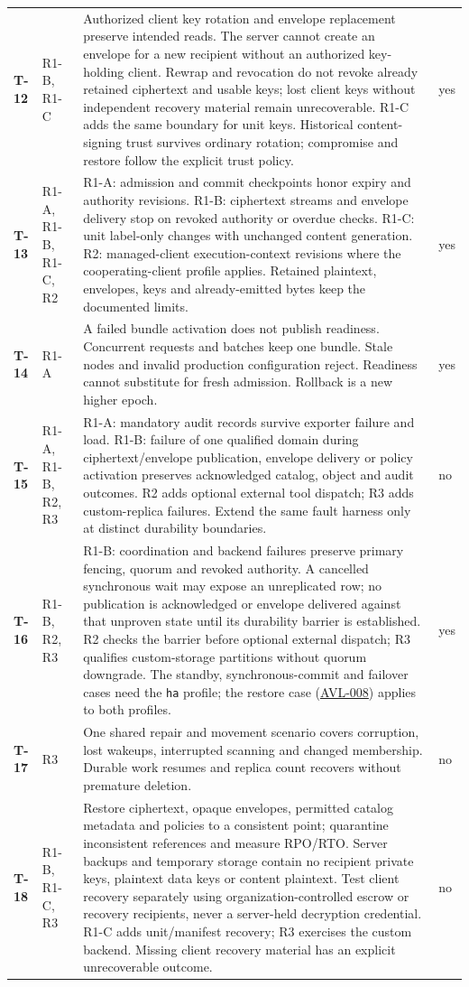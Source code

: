 \documentclass[11pt,a4paper]{article}
\newcommand{\code}[1]{{\small\nolinkurl{#1}}}
\newcommand{\rr}[1]{\hyperlink{req:#1}{#1}}
\newcommand{\testrow}[4]{\hypertarget{test:#1}{\textbf{#1}} & #2 & #3 & #4\\}
\begin{document}
\begin{longtable}{@{}P{0.06\textwidth}P{0.09\textwidth}P{0.68\textwidth}P{0.09\textwidth}@{}}
\testrow{T-12}{R1-B, R1-C}{Authorized client key rotation and envelope replacement preserve intended reads. The server cannot create an envelope for a new recipient without an authorized key-holding client. Rewrap and revocation do not revoke already retained ciphertext and usable keys; lost client keys without independent recovery material remain unrecoverable. R1-C adds the same boundary for unit keys. Historical content-signing trust survives ordinary rotation; compromise and restore follow the explicit trust policy.}{yes}
\testrow{T-13}{R1-A, R1-B, R1-C, R2}{R1-A: admission and commit checkpoints honor expiry and authority revisions. R1-B: ciphertext streams and envelope delivery stop on revoked authority or overdue checks. R1-C: unit label-only changes with unchanged content generation. R2: managed-client execution-context revisions where the cooperating-client profile applies. Retained plaintext, envelopes, keys and already-emitted bytes keep the documented limits.}{yes}
\testrow{T-14}{R1-A}{A failed bundle activation does not publish readiness. Concurrent requests and batches keep one bundle. Stale nodes and invalid production configuration reject. Readiness cannot substitute for fresh admission. Rollback is a new higher epoch.}{yes}
\testrow{T-15}{R1-A, R1-B, R2, R3}{R1-A: mandatory audit records survive exporter failure and load. R1-B: failure of one qualified domain during ciphertext/envelope publication, envelope delivery or policy activation preserves acknowledged catalog, object and audit outcomes. R2 adds optional external tool dispatch; R3 adds custom-replica failures. Extend the same fault harness only at distinct durability boundaries.}{no}
\testrow{T-16}{R1-B, R2, R3}{R1-B: coordination and backend failures preserve primary fencing, quorum and revoked authority. A cancelled synchronous wait may expose an unreplicated row; no publication is acknowledged or envelope delivered against that unproven state until its durability barrier is established. R2 checks the barrier before optional external dispatch; R3 qualifies custom-storage partitions without quorum downgrade. The standby, synchronous-commit and failover cases need the \code{ha} profile; the restore case (\rr{AVL-008}) applies to both profiles.}{yes}
\testrow{T-17}{R3}{One shared repair and movement scenario covers corruption, lost wakeups, interrupted scanning and changed membership. Durable work resumes and replica count recovers without premature deletion.}{no}
\testrow{T-18}{R1-B, R1-C, R3}{Restore ciphertext, opaque envelopes, permitted catalog metadata and policies to a consistent point; quarantine inconsistent references and measure RPO/RTO. Server backups and temporary storage contain no recipient private keys, plaintext data keys or content plaintext. Test client recovery separately using organization-controlled escrow or recovery recipients, never a server-held decryption credential. R1-C adds unit/manifest recovery; R3 exercises the custom backend. Missing client recovery material has an explicit unrecoverable outcome.}{no}

\end{longtable}
\end{document}
